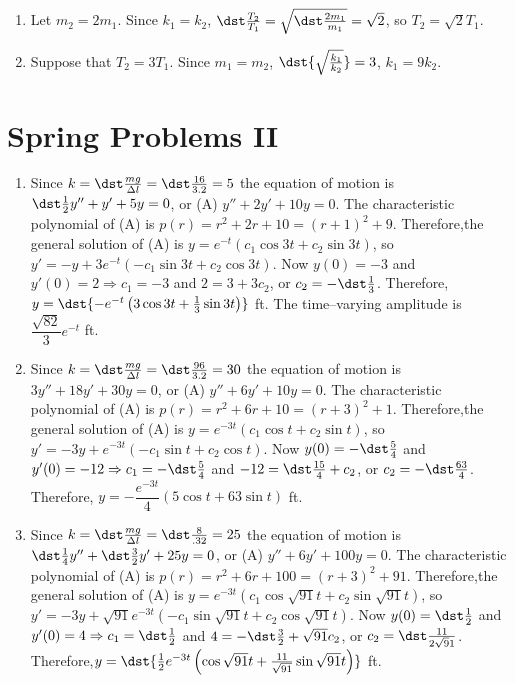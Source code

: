 \documentclass[openany]{book}
\newenvironment{sectionSolutions}{
 \begin{enumerate}[item-label={\thesection.\arabic{enumi}.}]
}{
 \end{enumerate}
}
\begin{document}
\begin{sectionSolutions}
\item
Let $m_2=2m_1$. Since $k_1=k_2$, $\dst\frac{T_2}{
T_1}=\sqrt{\dst\frac{2m_1}{ m_1}}=\sqrt2$, so $T_2=\sqrt2T_1$.

\addtocounter{enumi}{-1}
\item%
Suppose that $T_2=3T_1$. Since $m_1=m_2$, $\dst{\sqrt\frac{k_1}{
k_2}}=3$, $k_1=9k_2$.
\end{sectionSolutions}


\section{Spring Problems II}

\begin{sectionSolutions}
\item
Since $k=\dst\frac{mg}{\Delta l}=\dst\frac{16}{3.2}=5$ the equation of
motion is $\dst\frac{1}{2}y''+y'+5y=0$, or (A) $y''+2y'+10y=0$. The
characteristic polynomial of (A) is $p(r)=r^2+2r+10=(r+1)^2+9$.
Therefore,the general solution of (A) is
$y=e^{-t}(c_1\cos3t+c_2\sin3t)$, so
$y'=-y+3e^{-t}(-c_1\sin3t+c_2\cos3t)$. Now $y(0)=-3$ and
$y'(0)=2\Rightarrow c_1=-3$ and $2=3+3c_2$, or $c_2=-\dst\frac{1}{3}$.
Therefore,$y=\dst{-e^{-t}\left(3\cos3t+\frac{1}{3}\sin3t\right)}$ ft.
The time--varying amplitude is $\dfrac{\sqrt{82}}{3}e^{-t}$ ft.



\item
Since $k=\dst\frac{mg}{\Delta l}=\dst\frac{96}{3.2}=30$ the equation of
motion is $3y''+18y'+30y=0$, or (A) $y''+6y'+10y=0$. The
characteristic polynomial of (A) is $p(r)=r^2+6r+10=(r+3)^2+1$.
Therefore,the general solution of (A) is $y=e^{-3t}(c_1\cos t+c_2\sin
t)$, so $y'=-3y+e^{-3t}(-c_1\sin t+c_2\cos t)$. Now
$y(0)=-\dst\frac{5}{4}$ and $y'(0)=-12\Rightarrow c_1=-\dst\frac{5}{4}$
and $-12=\dst\frac{15}{4}+c_2$, or $c_2=-\dst\frac{63}{4}$. Therefore,
$y=-\dfrac{e^{-3t}}{4}(5\cos t+63\sin t)$ ft.

\item
Since $k=\dst\frac{mg}{\Delta l}=\dst\frac{8}{.32}=25$ the equation of
motion is $\dst\frac{1}{4}y''+\dst\frac{3}{2}y'+25y=0$, or (A)
$y''+6y'+100y=0$. The characteristic polynomial of (A) is
$p(r)=r^2+6r+100=(r+3)^2+91$. Therefore,the general solution of (A) is
$y=e^{-3t}(c_1\cos\sqrt{91}t+c_2\sin\sqrt{91}t)$, so
$y'=-3y+\sqrt{91}e^{-3t}(-c_1\sin\sqrt{91}t+c_2\cos\sqrt{91}t)$. Now
$y(0)=\dst\frac{1}{2}$ and $y'(0)=4\Rightarrow c_1=\dst\frac{1}{2}$ and
$4=-\dst\frac{3}{2}+\sqrt{91}c_2$, or $c_2=\dst\frac{11}{2\sqrt91}$.
Therefore,$y=\dst{\frac{1}{2}e^{-3t}\left(\cos\sqrt{91}t+\frac{11}{
\sqrt{91}}\sin\sqrt{91}t\right)}$ ft.



\end{sectionSolutions}
\end{document}
